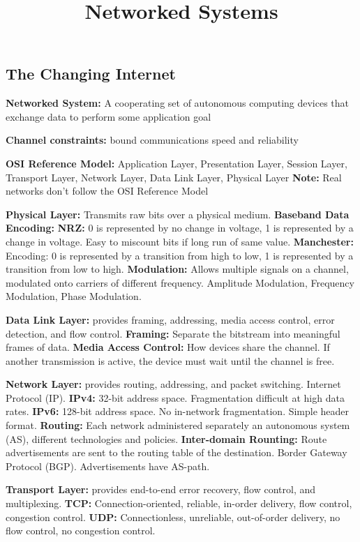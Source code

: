 \documentclass{article}
\title{Networked Systems}
\author{}
\date{}
\begin{document}
\footnotesize

\subsection*{The Changing Internet}

\textbf{Networked System:} A cooperating set of autonomous computing devices that exchange data to perform some application goal

\textbf{Channel constraints:} bound communications speed and reliability

\textbf{OSI Reference Model:} Application Layer, Presentation Layer, Session Layer, Transport Layer, Network Layer, Data Link Layer, Physical Layer
\textbf{Note:} Real networks don't follow the OSI Reference Model

\textbf{Physical Layer:} Transmits raw bits over a physical medium.
\textbf{Baseband Data Encoding:}
\textbf{NRZ:} 0 is represented by no change in voltage, 1 is represented by a change in voltage. Easy to miscount bits if long run of same value.
\textbf{Manchester:} Encoding: 0 is represented by a transition from high to low, 1 is represented by a transition from low to high.
\textbf{Modulation:} Allows multiple signals on a channel, modulated onto carriers of different frequency. Amplitude Modulation, Frequency Modulation, Phase Modulation.

\textbf{Data Link Layer:} provides framing, addressing, media access control, error detection, and flow control.
\textbf{Framing:} Separate the bitstream into meaningful frames of data.
\textbf{Media Access Control:} How devices share the channel. If another transmission is active, the device must wait until the channel is free.


\textbf{Network Layer:} provides routing, addressing, and packet switching. Internet Protocol (IP).
\textbf{IPv4:} 32-bit address space. Fragmentation difficult at high data rates.
\textbf{IPv6:} 128-bit address space. No in-network fragmentation. Simple header format.
\textbf{Routing:} Each network administered separately \- an autonomous system (AS), different technologies and policies.
\textbf{Inter-domain Rounting:} Route advertisements are sent to the routing table of the destination. Border Gateway Protocol (BGP). Advertisements have AS-path.


\textbf{Transport Layer:} provides end-to-end error recovery, flow control, and multiplexing.
\textbf{TCP:} Connection-oriented, reliable, in-order delivery, flow control, congestion control.
\textbf{UDP:} Connectionless, unreliable, out-of-order delivery, no flow control, no congestion control.
\end{document}
